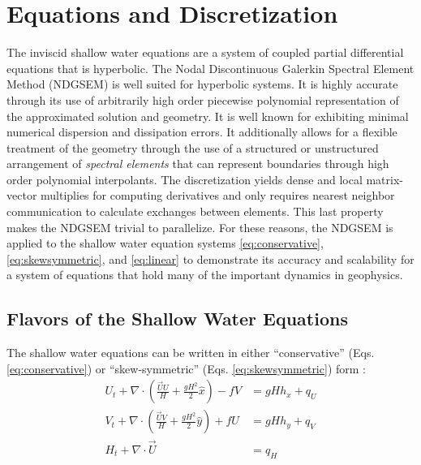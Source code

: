 \documentclass{softwaremanual}
\begin{document}
\chapter{Equations and Discretization}
The inviscid shallow water equations are a system of coupled partial differential equations that is hyperbolic. The Nodal Discontinuous Galerkin Spectral Element Method (NDGSEM) is well suited for hyperbolic systems. It is highly accurate through its use of arbitrarily high order piecewise polynomial representation of the approximated solution and geometry. It is well known for exhibiting minimal numerical dispersion and dissipation errors. It additionally allows for a flexible treatment of the geometry through the use of a structured or unstructured arrangement of \textit{spectral elements} that can represent boundaries through high order polynomial interpolants. The discretization yields dense and local matrix-vector multiplies for computing derivatives and only requires nearest neighbor communication to calculate exchanges between elements. This last property makes the NDGSEM trivial to parallelize. For these reasons, the NDGSEM is applied to the shallow water equation systems \eqref{eq:conservative}, \eqref{eq:skewsymmetric}, and \eqref{eq:linear} to demonstrate its accuracy and scalability for a system of equations that hold many of the important dynamics in geophysics. 

\section{Flavors of the Shallow Water Equations}
The shallow water equations can be written in either ``conservative'' (Eqs. \ref{eq:conservative}) or ``skew-symmetric'' (Eqs. \ref{eq:skewsymmetric}) form :
\begin{subequations}
\begin{align}
U_t  + \nabla \cdot \left( \frac{\vec{U}U}{H} + \frac{gH^2}{2}\hat{x} \right) - fV &= gHh_x  + q_U\\
V_t  + \nabla \cdot \left( \frac{\vec{U}V}{H} + \frac{gH^2}{2}\hat{y} \right) + fU &= gHh_y + q_V\\
H_t + \nabla \cdot \vec{U} &= q_H
\end{align}\label{eq:conservative}
\end{subequations}
\end{document}
